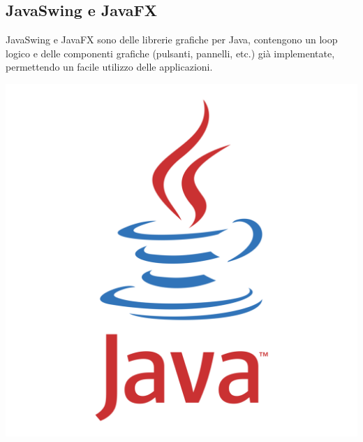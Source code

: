 \documentclass[a4paper,12pt]{report}
\begin{document}
\subsection{JavaSwing e JavaFX}
\begin{minipage}{0.7\textwidth}
    JavaSwing e JavaFX sono delle librerie grafiche per Java, contengono un loop logico e delle componenti grafiche (pulsanti, pannelli, etc.) già implementate, permettendo un facile utilizzo delle applicazioni.
\end{minipage}
\hfill
\begin{minipage}{0.3\textwidth}
  \includegraphics[width=\textwidth]{img/java.png}
\end{minipage}
%
\end{document}
